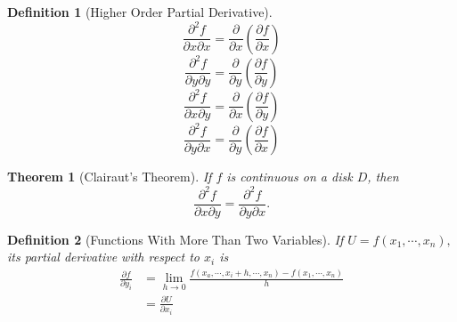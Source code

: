 \documentclass[12pt,a4paper]{article}
\newtheorem{thm}{Theorem}[subsection]
\newtheorem{df}{Definition}[subsection]
\def\del{\partial}
\def\pdx{\del x}
\def\pdx{\del y}
\def\pdfdx{\displaystyle\frac{\del f}{\del x}}
\def\pdfdy{\displaystyle\frac{\del f}{\del y}}
\def\pdfdxdx{\displaystyle\frac{\del^2 f}{\del x\del x}}
\def\pdfdydy{\displaystyle\frac{\del^2 f}{\del y\del y}}
\def\pdfdxdy{\displaystyle\frac{\del^2 f}{\del x\del y}}
\def\pdfdydx{\displaystyle\frac{\del^2 f}{\del y\del x}}
\def\pddx{\displaystyle\frac{\del }{\del x}}
\def\pddy{\displaystyle\frac{\del }{\del y}}
\begin{document}
\begin{df}[Higher Order Partial Derivative]
	\[\pdfdxdx=\pddx\left(\pdfdx\right)\]
	\[\pdfdydy=\pddy\left(\pdfdy\right)\]
	\[\pdfdxdy=\pddx\left(\pdfdy\right)\]
	\[\pdfdydx=\pddy\left(\pdfdx\right)\]
\end{df}
\begin{thm}[Clairaut's Theorem]
	If $f$ is continuous on a disk $D$, then \[\pdfdxdy=\pdfdydx.\]
\end{thm}
\begin{df}[Functions With More Than Two Variables]
	If $U=f(x_1,\cdots,x_n),$ its partial derivative with respect to $x_i$ is \[\begin{aligned}
		\frac{\partial f}{\pdx_i}&=\lim_{h\to0}\frac{f(x_a,\cdots,x_i+h,\cdots,x_n)-f(x_1,\cdots,x_n)}{h}\\&=\frac{\partial U}{\partial x_i}
	\end{aligned}\]	
\end{df}
\end{document}
